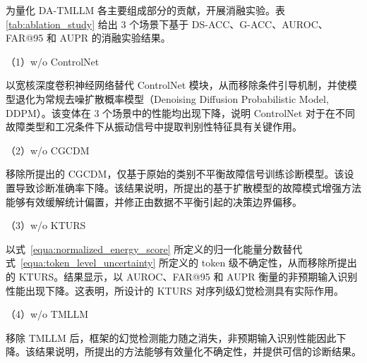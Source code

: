 为量化 DA-TMLLM 各主要组成部分的贡献，开展消融实验。表 \ref{tab:ablation_study} 给出 3 个场景下基于 DS-ACC、G-ACC、AUROC、FAR@95 和 AUPR 的消融实验结果。

（1）w/o ControlNet

以宽核深度卷积神经网络替代 ControlNet 模块，从而移除条件引导机制，并使模型退化为常规去噪扩散概率模型（Denoising Diffusion Probabilistic Model, DDPM）。该变体在 3 个场景中的性能均出现下降，说明 ControlNet 对于在不同故障类型和工况条件下从振动信号中提取判别性特征具有关键作用。

（2）w/o CGCDM

移除所提出的 CGCDM，仅基于原始的类别不平衡故障信号训练诊断模型。该设置导致诊断准确率下降。该结果说明，所提出的基于扩散模型的故障模式增强方法能够有效缓解统计偏置，并修正由数据不平衡引起的决策边界偏移。

（3）w/o KTURS

以式~\eqref{equa:normalized_energy_score} 所定义的归一化能量分数替代式~\eqref{equa:token_level_uncertainty} 所定义的 token 级不确定性，从而移除所提出的 KTURS。结果显示，以 AUROC、FAR@95 和 AUPR 衡量的非预期输入识别性能出现下降。这表明，所设计的 KTURS 对序列级幻觉检测具有实际作用。

（4）w/o TMLLM

移除 TMLLM 后，框架的幻觉检测能力随之消失，非预期输入识别性能因此下降。该结果说明，所提出的方法能够有效量化不确定性，并提供可信的诊断结果。

\renewcommand{\arraystretch}{1.3} 
\setlength{\tabcolsep}{6pt} %

